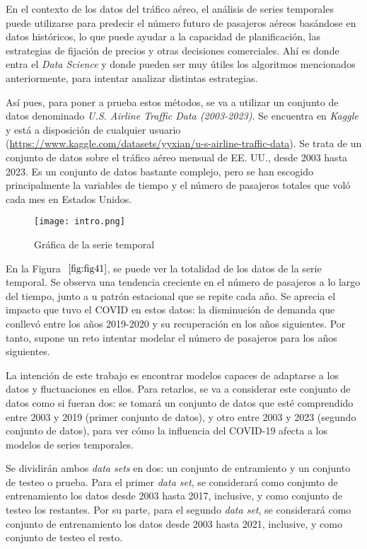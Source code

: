 \documentclass[12pt,twoside]{article}
\begin{document}
En el contexto de los datos del tráfico aéreo, el análisis de series temporales puede utilizarse para predecir el número futuro de pasajeros aéreos basándose en datos históricos, lo que puede ayudar a la capacidad de planificación, las estrategias de fijación de precios y otras decisiones comerciales. Ahí es donde entra el \textit{Data Science} y donde pueden ser muy útiles los algoritmos mencionados anteriormente, para intentar analizar distintas estrategias. 


Así pues, para poner a prueba estos métodos, se va a utilizar un conjunto de datos denominado \textit{U.S. Airline Traffic Data (2003-2023)}. Se encuentra en \textit{Kaggle} y está a disposición de cualquier usuario (\href{https://www.kaggle.com/datasets/yyxian/u-s-airline-traffic-data}{https://www.kaggle.com/datasets/yyxian/u-s-airline-traffic-data}). Se trata de un conjunto de datos sobre el tráfico aéreo mensual de EE. UU., desde 2003 hasta 2023. Es un conjunto de datos bastante complejo, pero se han escogido principalmente la variables de tiempo y el número de pasajeros totales que voló cada mes en Estados Unidos.

\begin{figure}[h]
    \centering    \texttt{[image: intro.png]}
    \caption{Gráfica de la serie temporal}
    \label{fig:fig41}
\end{figure}

En la Figura $~\ref{fig:fig41}$, se puede ver la totalidad de los datos de la serie temporal. Se observa una tendencia creciente en el número de pasajeros a lo largo del tiempo, junto a u patrón estacional que se repite cada año. Se aprecia el impacto que tuvo el COVID en estos datos: la disminución de demanda que conllevó entre los años 2019-2020 y su recuperación en los años siguientes. Por tanto, supone un reto intentar modelar el número de pasajeros para los años siguientes.

La intención de este trabajo es encontrar modelos capaces de adaptarse a los datos y fluctuaciones en ellos. Para retarlos, se va a considerar este conjunto de datos como si fueran dos: se tomará un conjunto de datos que esté comprendido entre 2003 y 2019 (primer conjunto de datos), y otro entre 2003 y 2023 (segundo conjunto de datos), para ver cómo la influencia del COVID-19 afecta a los modelos de series temporales. 

Se dividirán ambos \textit{data sets} en dos: un conjunto de entramiento y un conjunto de testeo o prueba. Para el primer \textit{data set}, se considerará como conjunto de entrenamiento los datos desde 2003 hasta 2017, inclusive, y como conjunto de testeo los restantes. Por su parte, para el segundo \textit{data set}, se considerará como conjunto de entrenamiento los datos desde 2003 hasta 2021, inclusive, y como conjunto de testeo el resto. 
\end{document}
